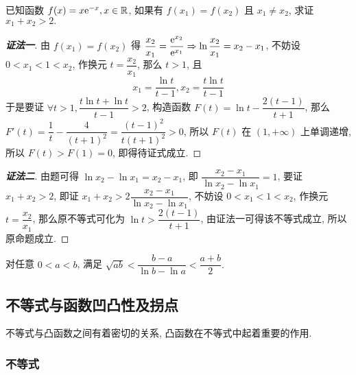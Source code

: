 \begin{example}
    已知函数 $f(x)=x\mathrm{e}^{-x},x\in\mathbb{R}$, 如果有 $f(x_1)=f(x_2)$ 且 $x_1\neq x_2$, 求证 $x_1+x_2>2.$
\end{example}
\begin{proof}[{\songti \textbf{证法一}}]
    由 $f(x_1)=f(x_2)$ 得 $\dfrac{x_2}{x_1}=\dfrac{\mathrm{e}^{x_2}}{\mathrm{e}^{x_1}}\Rightarrow \ln\dfrac{x_2}{x_1}=x_2-x_1$, 不妨设 $0<x_1<1<x_2$, 作换元 $t=\dfrac{x_2}{x_1}$, 那么 $t>1$, 且
    $$x_1=\dfrac{\ln t}{t-1},x_2=\dfrac{t\ln t}{t-1}$$
    于是要证 $\forall t>1,\dfrac{t\ln t+\ln t}{t-1}>2$, 构造函数 $F(t)=\ln t-\dfrac{2(t-1)}{t+1}$, 那么 $F'(t)=\dfrac{1}{t}-\dfrac{4}{(t+1)^2}=\dfrac{(t-1)^2}{t(t+1)^2}>0$, 所以 $F(t)$ 在 $(1,+\infty)$ 上单调递增, 所以 $F(t)>F(1)=0$, 即得待证式成立.
\end{proof}
\begin{proof}[{\songti \textbf{证法二}}]
    由题可得 $\ln x_2-\ln x_1=x_2-x_1$, 即 $\dfrac{x_2-x_1}{\ln x_2-\ln x_1}=1$, 要证 $x_1+x_2>2$, 即证 $x_1+x_2>2\dfrac{x_2-x_1}{\ln x_2-\ln x_1}$, 
    不妨设 $0<x_1<1<x_2$, 作换元 $t=\dfrac{x_2}{x_1}$, 那么原不等式可化为 $\ln t>\dfrac{2(t-1)}{t+1}$, 由证法一可得该不等式成立, 所以原命题成立.
\end{proof}

\begin{theorem}
    对任意 $0<a<b$, 满足 $\sqrt{ab}<\dfrac{b-a}{\ln b-\ln a}<\dfrac{a+b}{2}.$
\end{theorem}

\subsection{不等式与函数凹凸性及拐点}

不等式与凸函数之间有着密切的关系, 凸函数在不等式中起着重要的作用.

\subsubsection{不等式}

